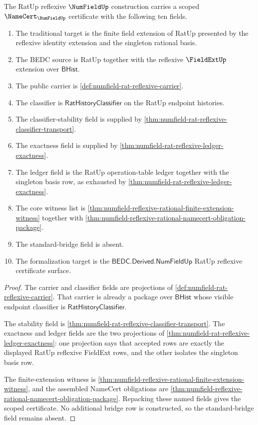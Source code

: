 \begin{theorem}
\label{thm:numfield-rat-reflexive-scoped-namecert-certificate}
The RatUp reflexive $\NumFieldUp$ construction carries a scoped
$\NameCert_{\NumFieldUp}$ certificate with the following ten fields.
\begin{enumerate}
\item The traditional target is the finite field extension of RatUp presented
by the reflexive identity extension and the singleton rational basis.
\item The BEDC source is RatUp together with the reflexive $\FieldExtUp$
extension over $\mathsf{BHist}$.
\item The public carrier is
\autoref{def:numfield-rat-reflexive-carrier}.
\item The classifier is $\mathsf{RatHistoryClassifier}$ on the RatUp endpoint
histories.
\item The classifier-stability field is supplied by
\autoref{thm:numfield-rat-reflexive-classifier-transport}.
\item The exactness field is supplied by
\autoref{thm:numfield-rat-reflexive-ledger-exactness}.
\item The ledger field is the RatUp operation-table ledger together with the
singleton basis row, as exhausted by
\autoref{thm:numfield-rat-reflexive-ledger-exactness}.
\item The core witness list is
\autoref{thm:numfield-reflexive-rational-finite-extension-witness} together
with \autoref{thm:numfield-reflexive-rational-namecert-obligation-package}.
\item The standard-bridge field is absent.
\item The formalization target is the
$\mathsf{BEDC.Derived.NumFieldUp}$ RatUp reflexive certificate surface.
\end{enumerate}
\end{theorem}
\begin{proof}
The carrier and classifier fields are projections of
\autoref{def:numfield-rat-reflexive-carrier}. That carrier is already a
package over $\mathsf{BHist}$ whose visible endpoint classifier is
$\mathsf{RatHistoryClassifier}$.

The stability field is
\autoref{thm:numfield-rat-reflexive-classifier-transport}. The exactness and
ledger fields are the two projections of
\autoref{thm:numfield-rat-reflexive-ledger-exactness}: one projection says
that accepted rows are exactly the displayed RatUp reflexive FieldExt rows,
and the other isolates the singleton basis row.

The finite-extension witness is
\autoref{thm:numfield-reflexive-rational-finite-extension-witness}, and the
assembled NameCert obligations are
\autoref{thm:numfield-reflexive-rational-namecert-obligation-package}.
Repacking these
named fields gives the scoped certificate. No additional bridge row is
constructed, so the standard-bridge field remains absent.
\end{proof}

